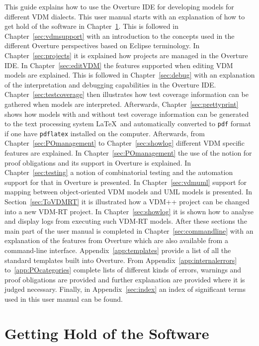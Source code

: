 \documentclass{overturerepchap}
\begin{document}
This guide explains how to use the Overture IDE for developing models
for different VDM dialects. This user manual starts with an explanation
of how to get hold of the software in
Chapter~\ref{sec:install}. This is followed in
Chapter~\ref{sec:vdmsupport} with an introduction to the concepts used
in the different Overture perspectives based on Eclipse
terminology. In Chapter~\ref{sec:projects} it is explained how
projects are managed in the Overture IDE. In Chapter~\ref{sec:editVDM}
the features supported when editing VDM models are explained. This is
followed in Chapter~\ref{sec:debug} with an explanation of the
interpretation and debugging capabilities in the Overture
IDE. Chapter~\ref{sec:testcoverage} then illustrates how test coverage
information can be gathered when models are interpreted. Afterwards,
Chapter~\ref{sec:prettyprint} shows how models with and without test
coverage information can be generated to the text processing system
\LaTeX\ and automatically converted to \texttt{pdf} format if one have
\texttt{pdflatex} installed on the computer. Afterwards, from
Chapter~\ref{sec:POmanagement} to Chapter~\ref{sec:showlog} different
VDM specific features are explained. In Chapter~\ref{sec:POmanagement}
the use of the notion for proof obligations and its support in
Overture is explained. In Chapter~\ref{sec:testing} a notion of
combinatorial testing and the automation support for that in Overture
is presented. In Chapter~\ref{sec:vdmuml} support for mapping between
object-oriented VDM models and UML models is presented. In
Section~\ref{sec:ToVDMRT} it is illustrated how a VDM++ project can be 
changed into a new VDM-RT project. In Chapter~\ref{sec:showlog} it
is shown how to analyse and display logs from executing
such VDM-RT models. After these sections the main part of the user
manual is completed in Chapter~\ref{sec:commandline} with an
explanation of the features from Overture which are also available from
a command-line interface. Appendix~\ref{app:templates} provide a list
of all the standard templates built into Overture. 
From Appendix~\ref{app:internalerrors}
to~\ref{app:POcategories} complete lists of different kinds of errors,
warnings and proof obligations are provided and further explanation
are provided where it is judged necessary.
Finally, in
Appendix~\ref{sec:index} an index of significant terms used in this
user manual can be found. 


\chapter{Getting Hold of the Software}\label{sec:install}
\end{document}
